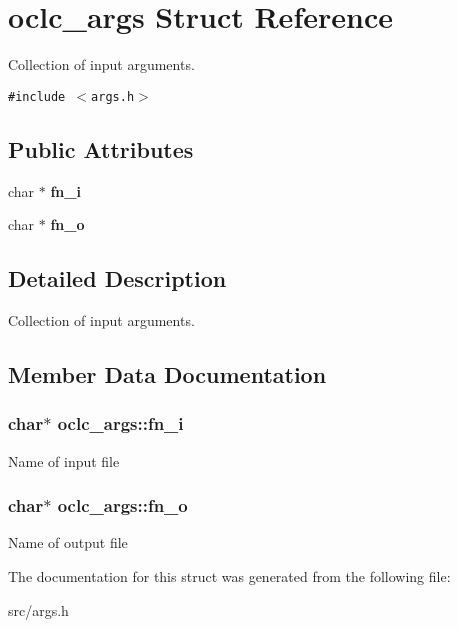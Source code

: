 \section{oclc\_\-args Struct Reference}
\label{structoclc__args}
Collection of input arguments.  


{\tt \#include $<$args.h$>$}

\subsection*{Public Attributes}
\begin{CompactItemize}
\item 
char $\ast$ \bf{fn\_\-i}
\item 
char $\ast$ \bf{fn\_\-o}
\end{CompactItemize}


\subsection{Detailed Description}
Collection of input arguments. 



\subsection{Member Data Documentation}
\subsubsection{\setlength{\rightskip}{0pt plus 5cm}char$\ast$ \bf{oclc\_\-args::fn\_\-i}}\label{structoclc__args_2e1c2d0c70f65184c62e938531cd1481}


Name of input file 
\subsubsection{\setlength{\rightskip}{0pt plus 5cm}char$\ast$ \bf{oclc\_\-args::fn\_\-o}}\label{structoclc__args_6aa013d8b50b8f6047a37e89dc50fe80}


Name of output file 

The documentation for this struct was generated from the following file:\begin{CompactItemize}
\item 
src/args.h\end{CompactItemize}
